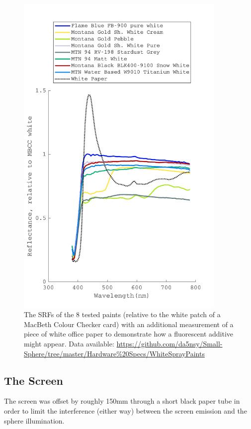 \begin{figure}[htbp]
\includegraphics[max width=0.9\textwidth,center]{figs/SmallSphere/VisualiseSPDs_result.pdf}
\caption{The \glspl{SRF} of the 8 tested paints (relative to the white patch of a MacBeth Colour Checker card) with an additional measurement of a piece of white office paper to demonstrate how a fluorescent additive might appear. Data available: \url{https://github.com/da5nsy/Small-Sphere/tree/master/Hardware\%20Specs/WhiteSprayPaints}}
\label{fig:spray}
\end{figure}


\subsection{The Screen}

The screen was offset by roughly 150mm through a short black paper tube in order to limit the interference (either way) between the screen emission and the sphere illumination. 

